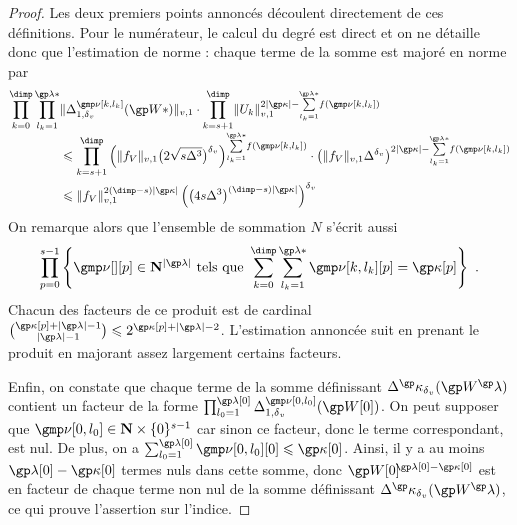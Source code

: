 \begin{proof}
  Les deux premiers points annoncés découlent directement de ces définitions.
  Pour le numérateur, le calcul du degré est direct et on ne détaille donc que
  l'estimation de norme : chaque terme de la somme est majoré en norme par
  \begin{align}
    \prod\indrange
    \prod_{ \indi_\ind = 1 }^{ \ip* }
    &
    \nv1{ \pmnum^\indl_{1, \dv}( \anyvp* ) }
    \cdot
    \prod_{\ind = \anydim + 1}^{\dimp}
    \nv1{ \pden_\ind }^{ 2\lgr\derp
      - \smash{ \sum\limits_{\indi_\ind = 1}^{\ip*} } f(\indl) }
    \\ & \le
    \prod_{\ind = \anydim + 1}^{\dimp}
    \left(
      \nv1{ \chow\anyvar }
      \bigl( 2 \sqrt{\anydim \anydeg^{3}} \bigr)^\dv
    \right)^{ \smash{ \sum\limits_{\indi_\ind = 1}^{\ip*} } f(\indl) }
    \cdot \left(
      \nv1{ \chow\anyvar } \anydeg^\dv
    \right)^{ 2\lgr\derp
      - \smash{ \sum\limits_{\indi_\ind = 1}^{\ip*} } f(\indl) }
    \\ & \le
    \nv1{ \chow\anyvar }^{2 (\dimp - \anydim) \lgr\derp}
    \left(
    \bigl( 4 \anydim \anydeg^{3} \bigr)^{(\dimp - \anydim) \lgr\derp}
    \right)^\dv
  \end{align}
  On remarque alors que l'ensemble de sommation \( N \) s'écrit aussi
  \begin{equation}
    \prod_{p = 0}^{\anydim - 1} \left\{
      \gmp\nu[][p] \in \N^{\lgr\ip}
      \text{ tels que }
      \sum\indrange \sum_{\indi_\ind = 1}^{\ip*}
      \gmp\nu[\ind, \indi_\ind][p]
      = \derp[p]
    \right\}
    \pmm.
  \end{equation}
  Chacun des facteurs de ce produit est de cardinal
  \(
    \binom{ \derp[p] + \lgr\ip - 1 }{ \lgr\ip - 1 }
    \le
    2^{ \derp[p] + \lgr\ip - 2 }
  \).
  L'estimation annoncée suit en prenant le produit en majorant assez largement
  certains facteurs.

  Enfin, on constate que chaque terme de la somme définissant
  \( \pmnum^\derp_\dv ( \anyvp^\ip ) \) contient un facteur de la forme
  \(
    \prod_{\indi_0 = 1}^{\ip[0]}
    \pmnum_{1, \dv}^{\gmp\nu[0, \indi_0]}( \anyvp[0] )
  \). On peut supposer que \( \gmp\nu[0, \indi_0] \in \N \times
    \set{0}^{\anydim-1} \) car sinon ce facteur, donc le terme correspondant,
  est nul. De plus, on a \( \sum_{\indi_0 = 1}^{\ip[0]} \gmp\nu[0, \indi_0][0]
    \le \derp[0] \). Ainsi, il y a au moins \( \ip[0] - \derp[0] \) termes
  nuls dans cette somme, donc \( \anyvp[0]^{\!\!\ip[0] - \derp[0]} \) est en
  facteur de chaque terme non nul de la somme définissant \( \pmnum^\derp_\dv
    ( \anyvp^\ip ) \), ce qui prouve l'assertion sur l'indice.
\end{proof}

